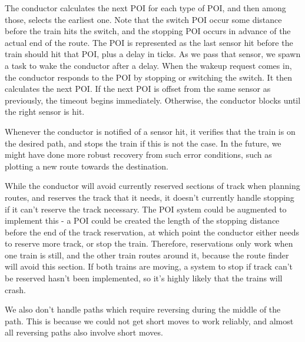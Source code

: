 \documentclass{article}
\begin{document}
The conductor calculates the next POI for each type of POI, and then among those, selects the earliest one.
Note that the switch POI occur some distance before the train hits the switch,
and the stopping POI occurs in advance of the actual end of the route.
The POI is represented as the last sensor hit before the train should hit that POI, plus a delay in ticks.
As we pass that sensor, we spawn a task to wake the conductor after a delay.
When the wakeup request comes in, the conductor responds to the POI by stopping or switching the switch.
It then calculates the next POI\@.
If the next POI is offset from the same sensor as previously, the timeout begins immediately.
Otherwise, the conductor blocks until the right sensor is hit.

Whenever the conductor is notified of a sensor hit, it verifies that the train is on the desired path, and stops
the train if this is not the case.
In the future, we might have done more robust recovery from such error conditions, such as plotting a new route towards
the destination.

While the conductor will avoid currently reserved sections of track when planning routes, and reserves the track
that it needs, it doesn't currently handle stopping if it can't reserve the track necessary.
The POI system could be augmented to implement this - a POI could be created the length of the stopping distance before the
end of the track reservation, at which point the conductor either needs to reserve more track, or stop the train.
Therefore, reservations only work when one train is still, and the other train routes around it,
because the route finder will avoid this section.
If both trains are moving, a system to stop if track can't be reserved hasn't been implemented,
so it's highly likely that the trains will crash.

We also don't handle paths which require reversing during the middle of the path.
This is because we could not get short moves to work reliably,
and almost all reversing paths also involve short moves.
\end{document}
